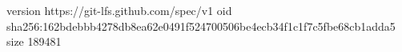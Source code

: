 version https://git-lfs.github.com/spec/v1
oid sha256:162bdebbb4278db8ea62e0491f524700506be4ecb34f1c1f7c5fbe68cb1adda5
size 189481
